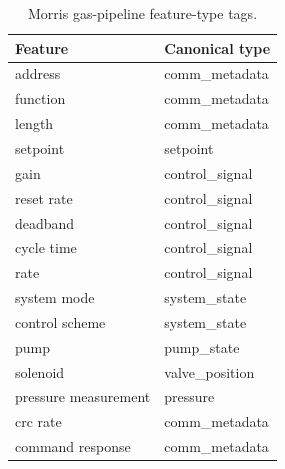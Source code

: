 \begin{table}[h]
\centering
\caption{Morris gas-pipeline feature-type tags.}
\label{tab:morris-types}
\small
\begin{tabular}{ll}
\toprule
Feature & Canonical type \\
\midrule
address              & comm\_metadata \\
function             & comm\_metadata \\
length               & comm\_metadata \\
setpoint             & setpoint \\
gain                 & control\_signal \\
reset rate           & control\_signal \\
deadband             & control\_signal \\
cycle time           & control\_signal \\
rate                 & control\_signal \\
system mode          & system\_state \\
control scheme       & system\_state \\
pump                 & pump\_state \\
solenoid             & valve\_position \\
pressure measurement & pressure \\
crc rate             & comm\_metadata \\
command response     & comm\_metadata \\
\bottomrule
\end{tabular}
\end{table}
